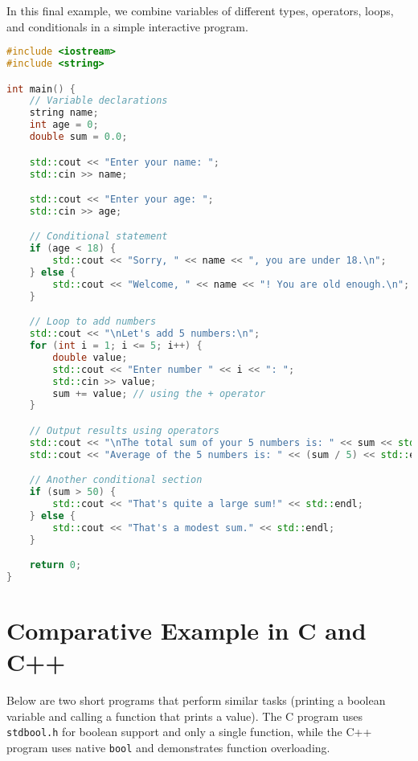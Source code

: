 \documentclass[a4paper,12pt]{article}
\begin{document}
In this final example, we combine variables of different types, operators, loops, and conditionals in a simple interactive program.

\begin{lstlisting}[language=C++, caption={Combined example}]
#include <iostream>
#include <string>

int main() {
    // Variable declarations
    string name;
    int age = 0;
    double sum = 0.0;

    std::cout << "Enter your name: ";
    std::cin >> name;

    std::cout << "Enter your age: ";
    std::cin >> age;

    // Conditional statement
    if (age < 18) {
        std::cout << "Sorry, " << name << ", you are under 18.\n";
    } else {
        std::cout << "Welcome, " << name << "! You are old enough.\n";
    }

    // Loop to add numbers
    std::cout << "\nLet's add 5 numbers:\n";
    for (int i = 1; i <= 5; i++) {
        double value;
        std::cout << "Enter number " << i << ": ";
        std::cin >> value;
        sum += value; // using the + operator
    }

    // Output results using operators
    std::cout << "\nThe total sum of your 5 numbers is: " << sum << std::endl;
    std::cout << "Average of the 5 numbers is: " << (sum / 5) << std::endl;

    // Another conditional section
    if (sum > 50) {
        std::cout << "That's quite a large sum!" << std::endl;
    } else {
        std::cout << "That's a modest sum." << std::endl;
    }

    return 0;
}
\end{lstlisting}

\newpage

\section*{Comparative Example in C and C++}

Below are two short programs that perform similar tasks (printing a boolean variable and calling a function that prints a value). The C program uses \texttt{stdbool.h} for boolean support and only a single function, while the C++ program uses native \texttt{bool} and demonstrates function overloading.
\end{document}
